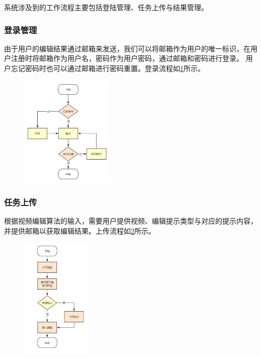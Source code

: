 系统涉及到的工作流程主要包括登陆管理、任务上传与结果管理。

\subsubsection{登录管理}

由于用户的编辑结果通过邮箱来发送，我们可以将邮箱作为用户的唯一标识，在用户注册时将邮箱作为用户名，密码作为用户密码，通过邮箱和密码进行登录。
用户忘记密码时也可以通过邮箱进行密码重置。登录流程如\ref{fig:login_process}所示。
\begin{figure}[ht]
    \centering
    \includegraphics[width=0.4\textwidth]{source/img/login_process.png}
    \label{fig:login_process}
\end{figure}

\subsubsection{任务上传}

根据视频编辑算法的输入，需要用户提供视频、编辑提示类型与对应的提示内容，并提供邮箱以获取编辑结果。上传流程如\ref{fig:upload_process}所示。
\begin{figure}[ht]
    \centering
    \includegraphics[width=0.3\textwidth]{source/img/edit_process.png}
    \label{fig:upload_process}
\end{figure}

